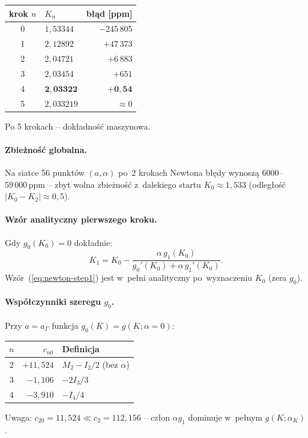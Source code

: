 \begin{center}
\begin{tabular}{c|l|r}
\hline
krok $n$ & $K_n$ & b\l{}\k{a}d [ppm] \\
\hline
0 & $1{,}53344$ & $-245\,805$ \\
1 & $2{,}12892$ & $+47\,373$ \\
2 & $2{,}04721$ & $+6\,883$ \\
3 & $2{,}03454$ & $+651$ \\
4 & $\mathbf{2{,}03322}$ & $\mathbf{+0{,}54}$ \\
5 & $2{,}033219$ & $\approx 0$ \\
\hline
\end{tabular}
\end{center}
Po 5 krokach -- dok\l{}adno\'s\'c maszynowa.

\paragraph{Zbie\.zno\'s\'c globalna.}
Na siatce 56 punkt\'ow $(a,\alpha)$ po~2 krokach Newtona b\l{\k{e}}dy wynosz\k{a}
$6000$--$59\,000\,\mathrm{ppm}$ -- zbyt wolna zbie\.zno\'s\'c
z~dalekiego startu $K_0\approx 1{,}533$
(odleg\l{}o\'s\'c $|K_0-K_2|\approx 0{,}5$).

\paragraph{Wz\'or analityczny pierwszego kroku.}
Gdy $g_0(K_0)=0$ dok\l{}adnie:
\begin{equation}
  \boxed{K_1 = K_0 - \frac{\alpha\,g_1(K_0)}{g_0'(K_0)+\alpha\,g_1'(K_0)}.}
  \label{eq:newton-step1}
\end{equation}
Wz\'or~(\ref{eq:newton-step1}) jest w~pe\l{}ni analityczny
po~wyznaczeniu $K_0$ (zera $g_0$).

\paragraph{Wsp\'o\l{}czynniki szeregu $g_0$.}
Przy $a=a_\Gamma$ funkcja $g_0(K)=g(K;\alpha=0)$:
\begin{center}
\begin{tabular}{c|r|l}
\hline
$n$ & $c_{n0}$ & Definicja \\
\hline
2 & $+11{,}524$ & $M_2 - I_2/2$ (bez $\alpha$) \\
3 & $-1{,}106$ & $-2I_3/3$ \\
4 & $-3{,}910$ & $-I_4/4$ \\
\hline
\end{tabular}
\end{center}
Uwaga: $c_{20}=11{,}524 \ll c_2=112{,}156$ --
cz\l{}on $\alpha g_1$ dominuje w~pe\l{}nym $g(K;\alpha_K)$.

